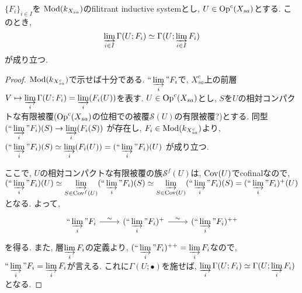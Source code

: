 \documentclass[../main]{subfiles}
\begin{document}
\begin{prop}
  $\{F_i\}_{i\in I}$を
  $\Mod(k_{X_{sa}})$のfilitrant inductive systemとし,
  $U\in\Op^c(X_{sa})$とする.
  このとき,
  \[
    \ilim[i\in I] \Gamma(U ; F_i)
    \simeq
    \Gamma(U ; \ilim[i\in I] F_i)
  \]
  が成り立つ.
\end{prop}
\begin{proof}
  $\Mod(k_{X_{sa}^c})$で示せば十分である.
  $\iilim[i] F_i$で, 
  $X_{sa}^c$上の前層
  $V\mapsto \ilim[i] \Gamma(U;F_i) = \ilim[i] ( F_i(U) )$を表す.
  $U\in\Op^c(X_{sa})$とし,
  $S$を$U$の相対コンパクトな有限被覆($\Op^c(X_{sa})$の位相での被覆$\mathscr{S}(U)$の有限被覆?)とする.
  同型
  $(\iilim[i] F_i)(S) \to \ilim[i] ( F_i(S) ) $
  が存在し,
  $F_i\in\Mod(k_{X_{sa}^c})$より,
  $(\iilim[i] F_i)(S) \simeq \ilim[i] ( F_i(U) ) =  (\iilim[i] F_i)(U)$
  が成り立つ.

  ここで, $U$の相対コンパクトな有限被覆の族$\mathscr{S}^f(U)$は, $\Cov(U)$でcofinalなので,
  $
  (\iilim[i] F_i)(U)
  \simeq \ilim[S\in\Cov^f(U)] (\iilim[i]F_i)(S)
  \simeq \ilim[S\in\Cov(U)] (\iilim[i]F_i)(S)
  = (\iilim[i] F_i)^+(U)
  $
  となる.
  よって,
  \[
    \begin{tikzcd}
      \iilim[i] F_i \ar[r,"\sim"]
      & (\iilim[i] F_i)^+ \ar[r,"\sim"]
      & (\iilim[i] F_i)^{++}
    \end{tikzcd}
  \]
  を得る.
  また, 層$\ilim[i] F_i$の定義より,
  $(\iilim[i] F_i)^{++}=\ilim[i] F_i$なので,
  $\iilim[i] F_i = \ilim[i] F_i$が言える.
  これに$\Gamma(U;\bullet)$を施せば,
  $\ilim[i]\Gamma(U;F_i) \simeq \Gamma(U;\ilim[i]F_i)$となる.
\end{proof}
\end{document}
